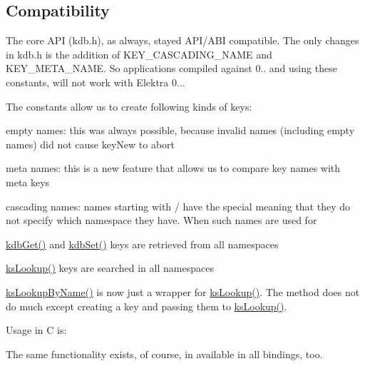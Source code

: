 \subsection*{Compatibility}

The core A\+P\+I (kdb.\+h), as always, stayed A\+P\+I/\+A\+B\+I compatible. The only changes in kdb.\+h is the addition of K\+E\+Y\+\_\+\+C\+A\+S\+C\+A\+D\+I\+N\+G\+\_\+\+N\+A\+M\+E and K\+E\+Y\+\_\+\+M\+E\+T\+A\+\_\+\+N\+A\+M\+E. So applications compiled against 0.. and using these constants, will not work with Elektra 0...

The constants allow us to create following kinds of keys\+:


\begin{DoxyItemize}
\item empty names\+: this was always possible, because invalid names (including empty names) did not cause key\+New to abort
\item meta names\+: this is a new feature that allows us to compare key names with meta keys
\item cascading names\+: names starting with / have the special meaning that they do not specify which namespace they have. When such names are used for
\begin{DoxyItemize}
\item \hyperlink{group__kdb_ga28e385fd9cb7ccfe0b2f1ed2f62453a1}{kdb\+Get()} and \hyperlink{group__kdb_ga11436b058408f83d303ca5e996832bcf}{kdb\+Set()} keys are retrieved from all namespaces
\item \hyperlink{group__keyset_gaa34fc43a081e6b01e4120daa6c112004}{ks\+Lookup()} keys are searched in all namespaces
\item \hyperlink{group__keyset_gad2e30fb6d4739d917c5abb2ac2f9c1a1}{ks\+Lookup\+By\+Name()} is now just a wrapper for \hyperlink{group__keyset_gaa34fc43a081e6b01e4120daa6c112004}{ks\+Lookup()}. The method does not do much except creating a key and passing them to \hyperlink{group__keyset_gaa34fc43a081e6b01e4120daa6c112004}{ks\+Lookup()}.
\end{DoxyItemize}
\end{DoxyItemize}

Usage in C is\+: 


The same functionality exists, of course, in available in all bindings, too.

